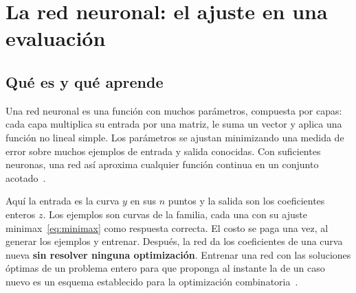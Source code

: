 \section{La red neuronal: el ajuste en una evaluación}
\subsection{Qué es y qué aprende}
Una red neuronal es una función con muchos parámetros, compuesta por capas: cada capa multiplica su entrada por una matriz, le suma un vector y aplica una función no lineal simple. Los parámetros se ajustan minimizando una medida de error sobre muchos ejemplos de entrada y salida conocidas. Con suficientes neuronas, una red así aproxima cualquier función continua en un conjunto acotado~\cite{cybenko,hornik}.

Aquí la entrada es la curva $y$ en sus $n$ puntos y la salida son los coeficientes enteros $z$. Los ejemplos son curvas de la familia, cada una con su ajuste minimax~\eqref{eq:minimax} como respuesta correcta. El costo se paga una vez, al generar los ejemplos y entrenar. Después, la red da los coeficientes de una curva nueva \textbf{sin resolver ninguna optimización}. Entrenar una red con las soluciones óptimas de un problema entero para que proponga al instante la de un caso nuevo es un esquema establecido para la optimización combinatoria~\cite{bengiolodi,nair}.

